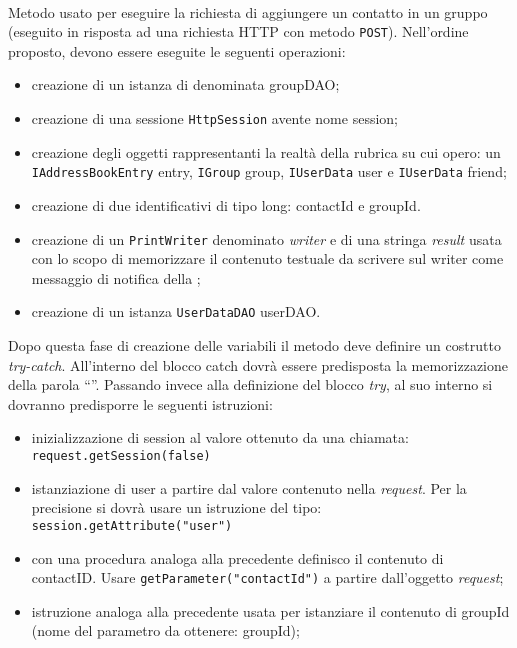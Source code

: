 \begin{description}
	\item{}\\	
	Metodo usato per eseguire la richiesta di aggiungere un contatto in un gruppo (eseguito in risposta ad una richiesta HTTP con metodo \texttt{POST}). Nell'ordine proposto, devono essere eseguite le seguenti operazioni:
	\begin{itemize}
		\item creazione di un istanza di  denominata groupDAO;
		\item creazione di una sessione \texttt{HttpSession} avente nome session;
		\item creazione degli oggetti rappresentanti la realtà della rubrica su cui opero: un \texttt{IAddressBookEntry} entry, \texttt{IGroup} group, \texttt{IUserData} user e \texttt{IUserData} friend;
		\item creazione di due identificativi di tipo long: contactId e groupId.
		\item creazione di un \texttt{PrintWriter} denominato \textit{writer} e di una stringa \textit{result} usata con lo scopo di memorizzare il contenuto testuale da scrivere sul writer come messaggio di notifica della ;
		\item creazione di un istanza \texttt{UserDataDAO} userDAO.
	\end{itemize}
	Dopo questa fase di creazione delle variabili il metodo deve definire un costrutto \textit{try-catch}. All'interno del blocco catch dovrà essere predisposta la memorizzazione della parola ``''. Passando invece alla definizione del blocco \textit{try}, al suo interno si dovranno predisporre le seguenti istruzioni:
	\begin{itemize}
		\item inizializzazione di session al valore ottenuto da una chiamata:\\
		\verb|request.getSession(false)|
		\item istanziazione di user a partire dal valore contenuto nella \textit{request}. Per la precisione si dovrà usare un istruzione del tipo:\\
		\verb|session.getAttribute("user")|
		\item con una procedura analoga alla precedente definisco il contenuto di contactID. Usare \verb|getParameter("contactId")| a partire dall'oggetto \textit{request};
		\item istruzione analoga alla precedente usata per istanziare il contenuto di groupId (nome del parametro da ottenere: groupId);

\end{itemize}
\end{description}
